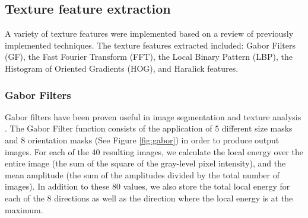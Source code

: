 \subsection{Texture feature extraction}

A variety of texture features were implemented based on a review of previously implemented techniques.
The texture features extracted included: Gabor Filters (GF), the Fast Fourier Transform (FFT), the Local Binary Pattern (LBP), the Histogram of Oriented Gradients (HOG), and Haralick features.

\subsubsection{Gabor Filters}

Gabor filters have been proven useful in image segmentation and texture analysis \cite{Zheng_2004}. The Gabor Filter function consists of the application of 5 different size masks and 8 orientation masks (See Figure \ref{fig:gabor}) in order to produce output images. For each of the 40 resulting images, we calculate the local energy over the entire image (the sum of the square of the gray-level pixel intensity), and the mean amplitude (the sum of the amplitudes divided by the total number of images). In addition to these 80 values, we also store the total local energy for each of the 8 directions as well as the direction where the local energy is at the maximum.

  
  
  
  
  
  
  
  
  
  